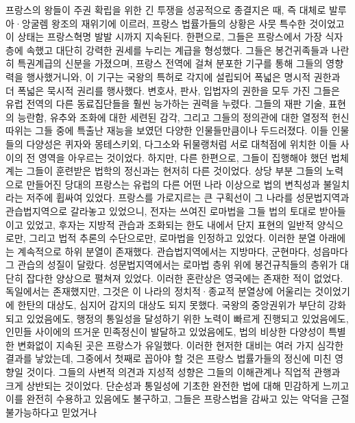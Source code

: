 프랑스의 왕들이 주권 확립을 위한 긴 투쟁을 성공적으로 종결지은 때,
즉 대체로 발루아^^b7앙굴렘 왕조의 재위기에 이르러,
프랑스 법률가들의 상황은 사뭇 특수한 것이었고 이 상태는
프랑스혁명 발발 시까지 지속된다.
한편으로, 그들은 프랑스에서 가장 식자층에 속했고
대단히 강력한 권세를 누리는 계급을 형성했다.
그들은 봉건귀족들과 나란히 특권계급의 신분을 가졌으며,
프랑스 전역에 걸쳐 분포한 기구를 통해 그들의 영향력을 행사했거니와,
이 기구는 국왕의 특허로 각지에 설립되어
폭넓은 명시적 권한과 더 폭넓은 묵시적 권리를 행사했다.
변호사, 판사, 입법자의 권한을 모두 가진 그들은 유럽 전역의 다른 동료집단들을
훨씬 능가하는 권력을 누렸다.
그들의 재판 기술, 표현의 능란함, 유추와 조화에 대한 세련된 감각,
그리고 
그들의 정의관에 대한 열정적 헌신
따위는 그들 중에 특출난 재능을 보였던 다양한 인물들만큼이나 두드러졌다.
이들 인물들의 다양성은
퀴자와 몽테스키외, 다그소와
뒤물랭처럼 서로 대척점에 위치한 이들 사이의
전 영역을 아우르는 것이었다.
하지만, 다른 한편으로, 그들이 집행해야 했던 법체계는
그들이 훈련받은 법학의 정신과는 현저히 다른 것이었다.
상당 부분 그들의 노력으로 만들어진 당대의 프랑스는
유럽의 다른 어떤 나라 이상으로 법의 변칙성과 불일치라는 저주에 휩싸여 있었다.
프랑스를 가로지르는 큰 구획선이 그 나라를
성문법지역과
관습법지역으로 갈라놓고 있었으니,
전자는 쓰여진 로마법을 그들 법의 토대로 받아들이고 있었고,
후자는 지방적 관습과 조화되는 한도 내에서
단지 표현의 일반적 양식으로만, 그리고
법적 추론의 수단으로만, 로마법을 인정하고 있었다.
이러한 분열 아래에는 계속적으로 하위 분열이 존재했다.
관습법지역에서는 지방마다,
군현마다,
성읍마다 그 관습의 성질이 달랐다.
성문법지역에서는
로마법 층위 위에 봉건규칙들의 층위가 대단히 잡다한 양상으로
펼쳐져 있었다.
이러한 혼란상은 영국에는 존재한 적이 없었다.
독일에서는 존재했지만, 그것은 이 나라의 정치적^^b7종교적 분열상에
어울리는 것이었기에 한탄의 대상도, 심지어 감지의 대상도 되지 못했다.
국왕의 중앙권위가 부단히 강화되고 있었음에도,
행정의 통일성을 달성하기 위한 노력이 빠르게 진행되고 있었음에도,
인민들 사이에의 뜨거운 민족정신이 발달하고 있었음에도,
법의 비상한 다양성이 특별한 변화없이 지속된 곳은 프랑스가 유일했다.
이러한 현저한 대비는 여러 가지 심각한 결과를 낳았는데,
그중에서 첫째로 꼽아야 할 것은 프랑스 법률가들의 정신에 미친 영향일 것이다.
그들의 사변적 의견과 지성적 성향은 그들의 이해관계나 직업적 관행과
크게 상반되는 것이었다.
단순성과 통일성에 기초한 완전한 법에 대해 민감하게 느끼고 이를 완전히
수용하고 있음에도 불구하고,
그들은 프랑스법을 감싸고 있는 악덕을 근절 불가능하다고 믿었거나
